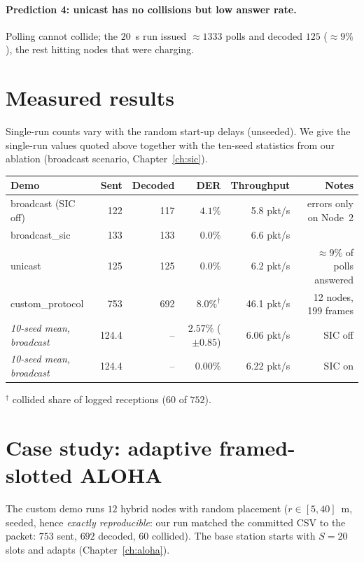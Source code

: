 \paragraph{Prediction 4: unicast has no collisions but low answer rate.}
Polling cannot collide; the $20$~s run issued $\approx1333$ polls and decoded $125$ ($\approx9\%$), the rest hitting nodes that were charging.

\section{Measured results}
\label{sec:measured}

Single-run counts vary with the random start-up delays (unseeded). We give the single-run values quoted above together with the ten-seed statistics from our ablation (broadcast scenario, Chapter~\ref{ch:sic}).

\begin{center}
\small
\renewcommand{\arraystretch}{1.12}
\begin{tabular}{@{}lrrrrr@{}}
\toprule
Demo & Sent & Decoded & DER & Throughput & Notes\\
\midrule
broadcast (SIC off) & 122 & 117 & $4.1\%$ & 5.8 pkt/s & errors only on Node~2\\
broadcast\_sic & 133 & 133 & $0.0\%$ & 6.6 pkt/s & \\
unicast & 125 & 125 & $0.0\%$ & 6.2 pkt/s & $\approx9\%$ of polls answered\\
custom\_protocol & 753 & 692 & $8.0\%^\dagger$ & 46.1 pkt/s & 12 nodes, 199 frames\\
\midrule
\emph{10-seed mean, broadcast} & 124.4 & -- & $2.57\%$ ($\pm0.85$) & 6.06 pkt/s & SIC off\\
\emph{10-seed mean, broadcast} & 124.4 & -- & $0.00\%$ & 6.22 pkt/s & SIC on\\
\bottomrule
\end{tabular}
\end{center}
{\footnotesize $^\dagger$ collided share of logged receptions ($60$ of $752$).}

\section{Case study: adaptive framed-slotted ALOHA}
\label{sec:casecustom}

The custom demo runs $12$ hybrid nodes with random placement ($r\in[5,40]$~m, seeded, hence \emph{exactly reproducible}: our run matched the committed CSV to the packet: $753$ sent, $692$ decoded, $60$ collided). The base station starts with $S=20$ slots and adapts (Chapter~\ref{ch:aloha}).


